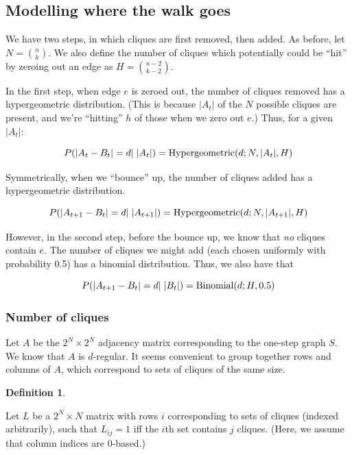 \documentclass[12pt]{article}
\theoremstyle{definition}
\newtheorem{defn}{Definition}[section]
\begin{document}
\subsection{Modelling where the walk goes}

We have two steps, in which cliques are first removed, then added.
As before, let $N = {n \choose k}$.
We also define the number of cliques which potentially could be ``hit'' by
zeroing out an edge as $H = {{n-2} \choose {k-2}}$.

In the first step, when edge $e$ is zeroed out, the number of cliques removed has
a hypergeometric distribution. (This is because $|A_t|$ of the $N$ possible cliques
are present, and we're ``hitting'' $h$ of those when we zero out $e$.)
Thus, for a given $|A_t|$:

\[
P(|A_t - B_t|=d|\hspace{1mm}|A_t|) = \text{Hypergeometric}(d; N, |A_t|, H)
\]

Symmetrically, when we ``bounce'' up, the number of cliques added has
a hypergeometric distribution.

\[
P(|A_{t+1} - B_t|=d|\hspace{1mm}|A_{t+1}|) = \text{Hypergeometric}(d; N, |A_{t+1}|, H)
\]

However, in the second step, before the bounce up, we know that {\em no} cliques contain $e$. The number of
cliques we might add (each chosen uniformly with probability 0.5) has 
a binomial distribution. Thus, we also have that

\[
P(|A_{t+1} - B_t|=d|\hspace{1mm}|B_t|) = \text{Binomial}(d; H, 0.5)
\]

\subsubsection{Number of cliques}

Let $A$ be the $2^N{\times}2^N$ adjacency matrix corresponding to the one-step graph $S$.
We know that $A$ is $d$-regular.
It seems convenient to group together rows and columns of $A$,
which correspond to sets of cliques of the same size.

\begin{defn} \label{defn:levels}

Let $L$ be a $2^N{\times}N$ matrix with rows $i$ corresponding to sets of cliques (indexed arbitrarily), such that
$L_{ij} = 1$ iff the $i$th set contains $j$ cliques. (Here, we assume that column indices are 0-based.)

\end{defn}
\end{document}
